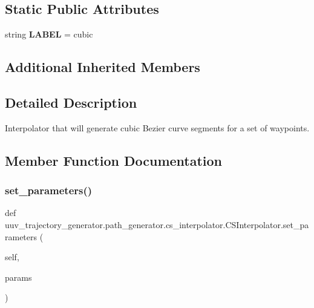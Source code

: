 \subsection*{Static Public Attributes}
\begin{DoxyCompactItemize}
\item 
\mbox{\label{classuuv__trajectory__generator_1_1path__generator_1_1cs__interpolator_1_1CSInterpolator_aaa519ab2cb687727d59a83dd4d5cf0b6}} 
string {\bfseries L\+A\+B\+EL} = \textquotesingle{}cubic\textquotesingle{}
\end{DoxyCompactItemize}
\subsection*{Additional Inherited Members}


\subsection{Detailed Description}
\begin{DoxyVerb}Interpolator that will generate cubic Bezier curve segments for a set of waypoints.
\end{DoxyVerb}
 

\subsection{Member Function Documentation}
\mbox{\label{classuuv__trajectory__generator_1_1path__generator_1_1cs__interpolator_1_1CSInterpolator_a5709f4bea7806927fd5d471bea615695}} 
\subsubsection{\texorpdfstring{set\+\_\+parameters()}{set\_parameters()}}
{\footnotesize\ttfamily def uuv\+\_\+trajectory\+\_\+generator.\+path\+\_\+generator.\+cs\+\_\+interpolator.\+C\+S\+Interpolator.\+set\+\_\+parameters (\begin{DoxyParamCaption}\item[{}]{self,  }\item[{}]{params }\end{DoxyParamCaption})}

